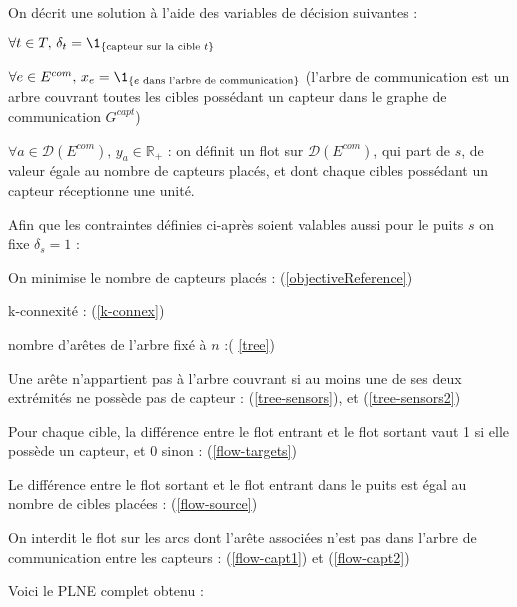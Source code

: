 \documentclass[12pt]{article}
\begin{document}
\noindent On décrit une solution à l'aide des variables de décision suivantes :
\begin{bulletlist}
  \item $\forall t\in T,\, \delta_t = \1_{\{\text{capteur sur la cible } t\}}$
  \item $\forall e\in E^{com},\, x_e = \1_{\{e \text{ dans l'arbre de communication}\}}$ (l'arbre de communication est un arbre couvrant toutes les cibles possédant un capteur dans le graphe de communication $G^{capt}$)
  \item $\forall a\in \mathcal{D}(E^{com}),\, y_a\in \mathbb{R}_+$ : on définit un flot sur $\mathcal{D}(E^{com})$, qui part de $s$, de valeur égale au nombre de capteurs placés, et dont chaque cibles possédant un capteur réceptionne une unité.
\end{bulletlist}

\bigskip

\noindent Afin que les contraintes définies ci-après soient valables aussi pour le puits $s$ on fixe $\delta_s = 1$ :

\begin{bulletlist}
  \item On minimise le nombre de capteurs placés : (\ref{objectiveReference})
  \item k-connexité : (\ref{k-connex})
  \item nombre d'arêtes de l'arbre fixé à $n$ :( \ref{tree})
  \item Une arête n'appartient pas à l'arbre couvrant si au moins une de ses deux extrémités ne possède pas de capteur : (\ref{tree-sensors}), et (\ref{tree-sensors2})
  \item Pour chaque cible, la différence entre le flot entrant et le flot sortant vaut 1 si elle possède un capteur, et 0 sinon : (\ref{flow-targets})
  \item Le différence entre le flot sortant et le flot entrant dans le puits est égal au nombre de cibles placées : (\ref{flow-source})
  \item On interdit le flot sur les arcs dont l'arête associées n'est pas dans l'arbre de communication entre les capteurs : (\ref{flow-capt1}) et (\ref{flow-capt2})
\end{bulletlist}

\noindent Voici le PLNE complet obtenu :
\end{document}
